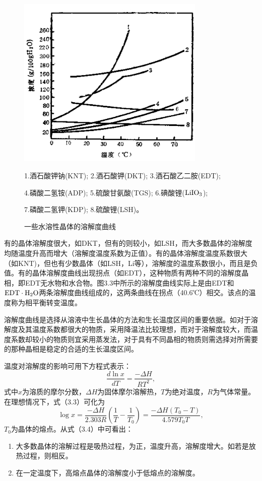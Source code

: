 \begin{figure}[hpb]
 \centering
 \includegraphics[width=0.8\textwidth]{fig/cp03/img3.3.jpg}
 \caption{一些水溶性晶体的溶解度曲线}
 1.酒石酸钾钠(KNT); 2.酒石酸钾(DKT); 3.酒石酸乙二胺(EDT);
 
 4.磷酸二氢铵(ADP); 5.硫酸甘氨酸(TGS); 6.碘酸锂($\rm LiIO_3$);
 
 7.磷酸二氢钾(KDP); 8.硫酸锂(LSH)。
\end{figure}

有的晶体溶解度很大，如DKT，但有的则较小，如LSH，而大多数晶体的溶解度均随温度升高而增大（溶解度温度系数为正值）。有的晶体溶解度温度系数很大（如KNT)，但也有少数晶体（如LSH，Li等），溶解度的温度系数很小，而且是负值。有的晶体溶解度曲线出现拐点（如EDT），这种物质有两种不同的溶解度晶相，即EDT无水物和水合物。图3.3中所示的溶解度曲线实际上是由EDT和$\rm EDT\cdot H_2O$两条溶解度曲线组成的，这两条曲线在拐点（40.6℃）相交。该点的温度称为相平衡转变温度。

溶解度曲线是选择从溶液中生长晶体的方法和生长温度区间的重要依据。如对于溶解度及其温度系数都很大的物质，采用降温法比较理想，而对于溶解度较大，而温度系数却较小的物质则宜采用蒸发法，对于具有不同晶相的物质则需选择对所需要的那种晶相是稳定的合适的生长温度区间。

温度对溶解度的影响可用下方程式表示：
\begin{equation}
\frac{d\ln{x}}{dT}=\frac{-\Delta H}{RT^2},
\end{equation}
式中$x$为溶质的摩尔分数，$\Delta H$为固体摩尔溶解热，$T$为绝对温度，$R$为气体常量。在理想情况下，式（3.3）可化为
\begin{equation}
\log x=\frac{-\Delta H}{2.303R}\left( \frac{1}{T}-\frac{1}{T_0}\right) =\frac{-\Delta H(T_0-T)}{4.579T_0T},
\end{equation}
$T_0$为晶体的熔点。从式（3.4）中可看出：
\begin{enumerate}[(1)]\itemsep -0.5ex
\item 大多数晶体的溶解过程是吸热过程，为正，温度升高，溶解度增大。如若是放热过程，则相反。
\item 在一定温度下，高熔点晶体的溶解度小于低熔点的溶解度。
\end{enumerate}

